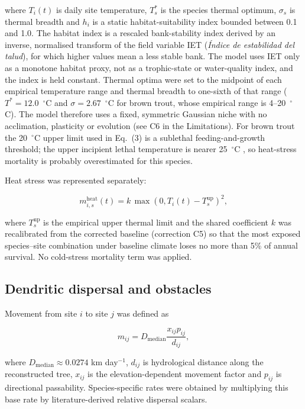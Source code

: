 \documentclass[11pt,a4paper]{article}
\begin{document}
where $T_i(t)$ is daily site temperature, $T_s^*$ is the species thermal optimum, $\sigma_s$ is thermal breadth and $h_i$ is a static habitat-suitability index bounded between 0.1 and 1.0. The habitat index is a rescaled bank-stability index derived by an inverse, normalised transform of the field variable IET (\textit{\'Indice de estabilidad del talud}), for which higher values mean a less stable bank. The model uses IET only as a monotone habitat proxy, not as a trophic-state or water-quality index, and the index is held constant. Thermal optima were set to the midpoint of each empirical temperature range and thermal breadth to one-sixth of that range ($T^*=12.0$~$^\circ$C and $\sigma=2.67$~$^\circ$C for brown trout, whose empirical range is 4--20~$^\circ$C). The model therefore uses a fixed, symmetric Gaussian niche with no acclimation, plasticity or evolution (see C6 in the Limitations). For brown trout the 20~$^\circ$C upper limit used in Eq.~(3) is a sublethal feeding-and-growth threshold; the upper incipient lethal temperature is nearer 25~$^\circ$C \cite{Elliott2010}, so heat-stress mortality is probably overestimated for this species.

Heat stress was represented separately:

\begin{equation}
m^{\mathrm{heat}}_{i,s}(t) = k\,\max\left(0,T_i(t)-T^{\mathrm{up}}_s\right)^2,
\end{equation}

where $T^{\mathrm{up}}_s$ is the empirical upper thermal limit and the shared coefficient $k$ was recalibrated from the corrected baseline (correction C5) so that the most exposed species--site combination under baseline climate loses no more than 5\% of annual survival. No cold-stress mortality term was applied.

\subsection{Dendritic dispersal and obstacles}

Movement from site $i$ to site $j$ was defined as

\begin{equation}
m_{ij}=D_{\mathrm{median}}\frac{x_{ij}p_{ij}}{d_{ij}},
\end{equation}

where $D_{\mathrm{median}}\approx0.0274$ km day$^{-1}$, $d_{ij}$ is hydrological distance along the reconstructed tree, $x_{ij}$ is the elevation-dependent movement factor and $p_{ij}$ is directional passability. Species-specific rates were obtained by multiplying this base rate by literature-derived relative dispersal scalars.
\end{document}
